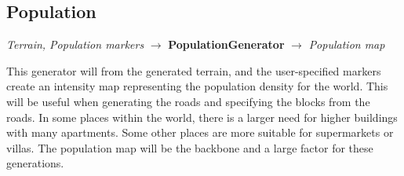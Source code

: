 \subsection{Population}
\begin{center}
    \textit{Terrain, Population markers} $\rightarrow$ \textbf{PopulationGenerator} $\rightarrow$ \textit{Population map} 
\end{center}
This generator will from the generated terrain, and the user-specified markers create an intensity map representing the population density for the world.
This will be useful when generating the roads and specifying the blocks from the roads. 
In some places within the world, there is a larger need for higher buildings with many apartments. 
Some other places are more suitable for supermarkets or villas. 
The population map will be the backbone and a large factor for these generations. 